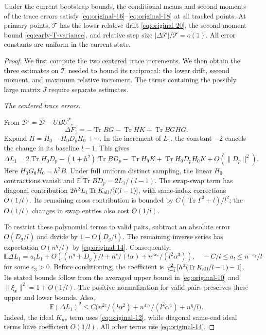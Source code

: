 \begin{lemma}\label{lem:early-trace-transitions}
Under the current bootstrap bounds, the conditional means and second
moments of the trace errors satisfy
\eqref{eq:original-16}--\eqref{eq:original-18} at all tracked points.
At primary points, \(\mathcal T\) has the lower relative drift
\eqref{eq:original-20}, the second-moment bound
\eqref{eq:early-T-variance}, and relative step size
\(\lvert\Delta\mathcal T\rvert/\mathcal T=o(1)\).
All error constants are uniform in the current state.
\end{lemma}
\begin{proof}

We first compute the two centered trace increments. We then obtain the
three estimates on \(\mathcal T\) needed to bound its reciprocal:
the lower drift, second moment, and maximum relative increment. The terms
containing the possibly large matrix \(J\) require separate estimates.

\emph{The centered trace errors.}

From \(\mathcal D'=\mathcal D-U B U^T\),
\[
 \Delta F_1=-\operatorname{Tr}B G-\operatorname{Tr}H K+\operatorname{Tr}B G H G .
\]
Expand \(H=H_0-H_0 D_p H_0+\cdots\). In the increment of \(L_1\),
the constant \(-2\) cancels the change in its baseline \(l-1\). This gives
\begin{equation}
 \Delta L_1=
 2\operatorname{Tr}H_0 D_p-(1+h^2)\operatorname{Tr}B D_p-\operatorname{Tr}H_0 K
 +\operatorname{Tr}H_0 D_p H_0 K+O(\|D_p\|^2).
\label{eq:original-15}
\end{equation}
Here \(H_0 G_0 H_0=h^2 B\). Under full uniform distinct sampling, the
linear \(H_0\) contractions vanish and
\(\mathbb E\operatorname{Tr}B D_p=2L_1/(l-1)\).
The swap-swap term has diagonal contribution
\(2 h^2 L_1\operatorname{Tr}K_{\rm all}/[l(l-1)]\), with same-index
corrections \(O(1/l)\). Its remaining cross contribution is bounded by
\(C(\operatorname{Tr}\Gamma^3+l)/l^2\); the \(O(1/l)\) changes in swap
entries also cost \(O(1/l)\).

To restrict these polynomial terms to valid pairs, subtract an absolute
error \(O(D_g/l)\) and divide by \(1-O(D_g/l)\). The remaining inverse
series has expectation \(O(n^\eta/l)\) by \eqref{eq:original-14}.
Consequently,
\begin{equation}
 \mathbb E\Delta L_1=a_l L_1+
 O\!\left((n^\eta+D_g)/l+n^c/(l\alpha)+n^{3v_*}/(l^2\alpha^3)\right),
 \quad
 -C/l\le a_l\le n^{-c_3}/l
\label{eq:original-16}
\end{equation}
for some \(c_3>0\). Before conditioning, the coefficient is
\(\frac{2}{l-1}[h^2(\operatorname{Tr}K_{\rm all}/l-1)-1]\).
Its stated bounds follow from the averaged upper bound in
\eqref{eq:original-10} and \(\|\xi_x\|^2=1+O(1/l)\).
The positive normalization for valid pairs preserves these upper and
lower bounds. Also,
\begin{equation}
 \mathbb E(\Delta L_1)^2\le C\big(n^{2c}/(l\alpha^2)+n^{4v_*}/(l^2\alpha^4)+n^\eta/l\big).
\label{eq:original-17}
\end{equation}
Indeed, the ideal \(K_{uv}\) term uses \eqref{eq:original-12}, while
diagonal same-end ideal terms have coefficient \(O(1/l)\).
All other terms use \eqref{eq:original-14}.


\end{proof}
